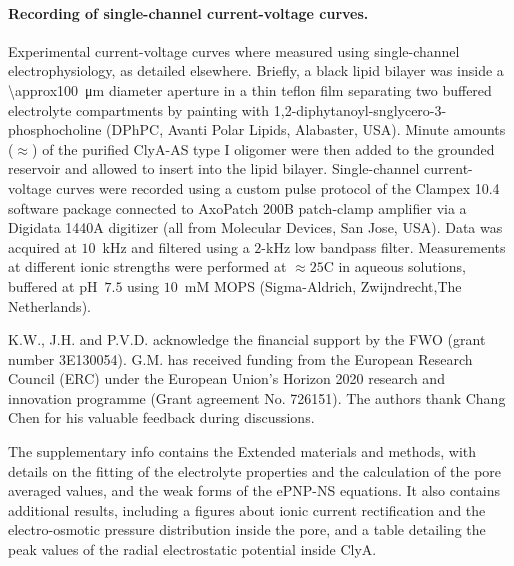 \documentclass[journal=ancac3,manuscript=article,etalmode=truncate,maxauthors=0,layout=onecolumn]{achemso}
\begin{document}
\paragraph{Recording of single-channel current-voltage curves.}
%
Experimental current-voltage curves where measured using single-channel electrophysiology, as detailed
elsewhere.\cite{Maglia-2010,Soskine-2012,Soskine-2013} Briefly, a black lipid bilayer was inside a
\SI{\approx100}{\um} diameter aperture in a thin teflon film separating two buffered electrolyte compartments
by painting with 1,2-diphytanoyl-snglycero-3-phosphocholine (DPhPC, Avanti Polar Lipids, Alabaster, USA).
Minute amounts ($\approx$) of the purified ClyA-AS type I oligomer were then added to the grounded \cis{}
reservoir and allowed to insert into the lipid bilayer. Single-channel current-voltage curves were recorded
using a custom pulse protocol of the Clampex 10.4 software package connected to AxoPatch 200B patch-clamp
amplifier via a Digidata 1440A digitizer (all from Molecular Devices, San Jose, USA). Data was acquired at
$10$~kHz and filtered using a $2$-kHz low bandpass filter. Measurements at different ionic strengths were
performed at $\approx25$\textdegree C in aqueous  solutions, buffered at pH~$7.5$ using $10$~mM MOPS
(Sigma-Aldrich, Zwijndrecht,The Netherlands).

\begin{acknowledgement}
  K.W., J.H. and P.V.D. acknowledge the financial support by the FWO (grant number 3E130054). G.M. has
  received funding from the European Research Council (ERC) under the European Union's Horizon 2020 research
  and innovation programme (Grant agreement No. 726151). The authors thank Chang Chen for his valuable
  feedback during discussions.
\end{acknowledgement}

\begin{suppinfo}
	The supplementary info contains the Extended materials and methods, with details on the fitting of the
	electrolyte properties and the calculation of the pore averaged values, and the weak forms of the ePNP-NS
	equations. It also contains additional results, including a figures about ionic current rectification and
	the electro-osmotic pressure distribution inside the pore, and a table detailing the peak values of the
	radial electrostatic potential inside ClyA.
\end{suppinfo}



%
\end{document}
